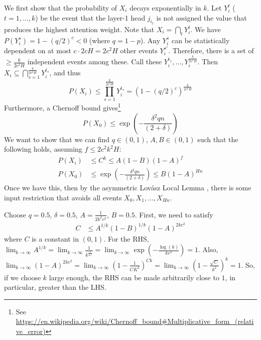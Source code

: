 \documentclass[11pt,a4paper]{article}
\begin{document}
We first show that the probability of $X_i$ decays exponentially in $k$.
Let $Y_i^t$ ($t=1,...,k$) be the event that the layer-1 head $j_{i_t}$ is not assigned the value that produces the highest attention weight.
Note that $X_i = \bigcap_t Y_i^t$.
We have $P(Y_i^s) = 1-(q/2)^c < 0$ (where $q = 1-p$).
Any $Y_i^s$ can be statistically dependent on at most $c \cdot 2cH = 2c^2H$ other events $Y_i^{s'}$.
Therefore, there is a set of $\geq \frac{k}{2c^2H}$ independent events among these.
Call these $Y_i^{t_1}, ..., Y_i^{\frac{k}{2c^2H}}$.
Then $X_i \subseteq \bigcap_{s=1}^{\frac{k}{2c^2H}} Y_i^{t_s}$, and thus
\begin{equation}
    P(X_i) \leq \prod_{s=1}^{\frac{k}{2c^2H}} Y_i^{t_s} = \left(1-(q/2)^c\right)^{\frac{k}{2c^2H}}
\end{equation}
Furthermore, a Chernoff bound gives\footnote{See 
\url{https://en.wikipedia.org/wiki/Chernoff_bound#Multiplicative_form_(relative_error)}}
\begin{equation}
P(X_0) \leq    \exp\left(-\frac{\delta^2qn}{(2+\delta)}\right)
\end{equation}
We want to show that we can find $q \in (0,1)$, $A, B \in (0,1)$ such that the following holds, assuming $f \leq 2c^2k^2H$:
\begin{align}
 P(X_i) &\leq  C^k \leq A(1-B)(1-A)^f \\
P(X_0) &\leq \exp\left(-\frac{\delta^2qn}{(2+\delta)}\right)  \leq B (1-A)^{Hn}
\end{align}
Once we have this, then by the asymmetric Lov{\'a}sz Local Lemma \cite{mitzenmacherprobability}, there is some input restriction that avoids all events $X_0, X_1, ..., X_{Hn}$.

Choose $q=0.5$, $\delta=0.5$, $A=\frac{1}{2k^2c^2}$, $B=0.5$.
First, we need to satisfy
\begin{align}
    C &\leq A^{1/k}(1-B)^{1/k}(1-A)^{2kc^2} 
\end{align}
where $C$ is a constant in $(0,1)$.
For the RHS, 
$\lim_{k\rightarrow \infty} A^{1/k} = \lim_{k\rightarrow \infty} \frac{1}{k^\frac{1}{kc^2}} = \lim_{k\rightarrow \infty} \exp(-\frac{\log(k)}{kc^2}) = 1$.
Also, $\lim_{k\rightarrow \infty} (1-A)^{2kc^2} = \lim_{k\rightarrow \infty} (1-\frac{1}{CK^2})^{Ck} = \lim_{k\rightarrow \infty} (1-\frac{\sqrt{C}}{k^2})^{k} = 1$. So, if we choose $k$ large enough, the RHS can be made arbitrarily close to $1$, in particular, greater than the LHS.
\end{document}
